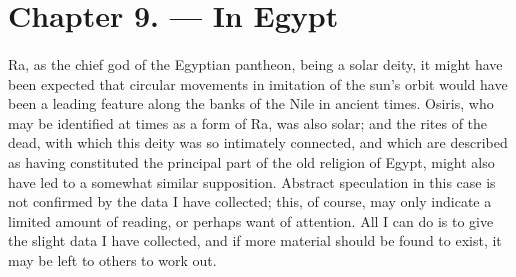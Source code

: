 \documentclass[a4paper, 11pt, oneside, polutonikogreek, english]{article}
\begin{document}
\section{Chapter 9. --- In Egypt}
\paragraph{}
Ra, as the chief god of the Egyptian pantheon, being a solar deity, it might have been expected that circular movements in imitation of the sun's orbit would have been a leading feature along the banks of the Nile in ancient times. Osiris, who may be identified at times as a form of Ra, was also solar; and the rites of the dead, with which this deity was so intimately connected, and which are described as having constituted the principal part of the old religion of Egypt, might also have led to a somewhat similar supposition. Abstract speculation in this case is not confirmed by the data I have collected; this, of course, may only indicate a limited amount of reading, or perhaps want of attention. All I can do is to give the slight data I have collected, and if more material should be found to exist, it may be left to others to work out.
\end{document}
